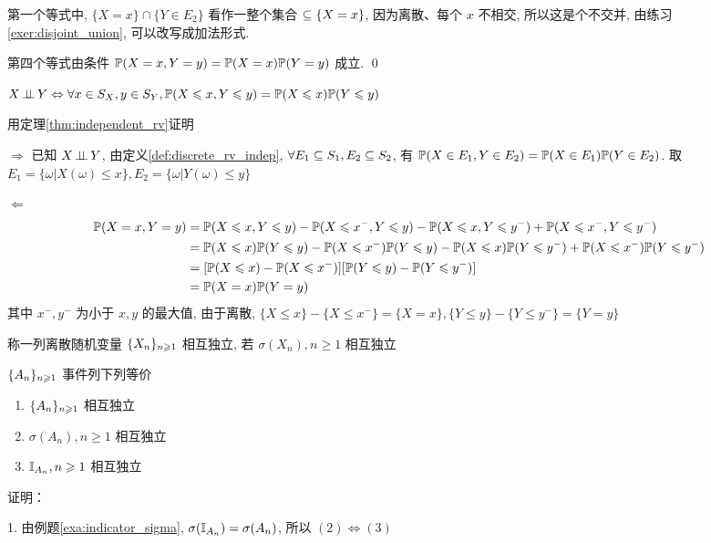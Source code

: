 第一个等式中, $\{X=x\}\cap \{Y\in E_2\}$ 看作一整个集合 $\subseteq \{X=x\}$, 因为离散、每个 $x$ 不相交, 所以这是个不交并, 由练习\ref{exer:disjoint_union}, 可以改写成加法形式. 

第四个等式由条件 $\mathbb{P}(X=x,Y=y)=\mathbb{P}(X=x)\mathbb{P}(Y=y)$ 成立. \qed

\begin{theorem}
    $X\operatorname{\perp\!\!\!\perp} Y\Leftrightarrow \forall x\in S_X,y\in S_Y, \mathbb{P}(X\leqslant x,Y\leqslant y)=\mathbb{P}(X\leqslant x)\mathbb{P}(Y\leqslant y)$
\end{theorem}

用定理\ref{thm:independent_rv}证明

$\Rightarrow$ 已知 $X\operatorname{\perp\!\!\!\perp} Y$, 由定义\ref{def:discrete_rv_indep}, $\forall E_1\subseteq S_1,E_2\subseteq S_2$, 有 $\mathbb{P}(X\in E_1,Y\in E_2)=\mathbb{P}(X\in E_1)\mathbb{P}(Y\in E_2)$. 取 $E_1=\{\omega|X(\omega)\leq x\}, E_2=\{\omega|Y(\omega)\leq y\}$

$\Leftarrow$
\[
\begin{aligned}
    \mathbb{P}(X=x,Y=y)&=\mathbb{P}(X\leqslant x,Y\leqslant y)-\mathbb{P}(X\leqslant x^-,Y\leqslant y)-\mathbb{P}(X\leqslant x,Y\leqslant y^-)+\mathbb{P}(X\leqslant x^-,Y\leqslant y^-)\\
    &=\mathbb{P}(X\leqslant x)\mathbb{P}(Y\leqslant y)-\mathbb{P}(X\leqslant x^-)\mathbb{P}(Y\leqslant y)-\mathbb{P}(X\leqslant x)\mathbb{P}(Y\leqslant y^-)+\mathbb{P}(X\leqslant x^-)\mathbb{P}(Y\leqslant y^-)\\
    &=[\mathbb{P}(X\leqslant x)-\mathbb{P}(X\leqslant x^-)][\mathbb{P}(Y\leqslant y)-\mathbb{P}(Y\leqslant y^-)]\\
    &=\mathbb{P}(X=x)\mathbb{P}(Y=y)
\end{aligned}
\]
其中 $x^-,y^-$ 为小于 $x,y$ 的最大值, 由于离散, $\{X\leq x\}-\{X\leq x^-\}=\{X=x\}, \{Y\leq y\}-\{Y\leq y^-\}=\{Y=y\}$

\begin{definition}
    称一列离散随机变量 $\{{X}_{n}\}_{n \geqslant 1}$ 相互独立, 若 $\sigma(X_n), n\geq 1$ 相互独立
\end{definition}

\begin{theorem}
    $\{{A}_{n}\}_{n \geqslant 1}$ 事件列下列等价
    \begin{enumerate}
        \item $\{{A}_{n}\}_{n \geqslant 1}$ 相互独立
        \item $\sigma(A_n), n\geq 1$ 相互独立
        \item $\mathbb I_{A_n}, n\geqslant 1$ 相互独立
    \end{enumerate}
\end{theorem}

证明：

1. 由例题\ref{exa:indicator_sigma}, $\sigma(\mathbb I_{A_n})=\sigma(A_n)$, 所以 $(2)\Leftrightarrow (3)$

